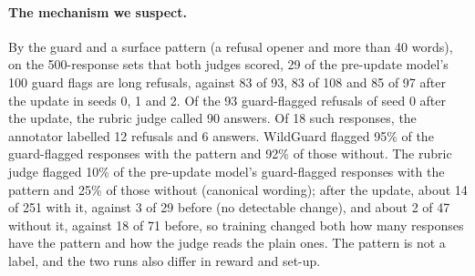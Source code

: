 \paragraph{The mechanism we suspect.} By the guard and a surface pattern (a refusal opener and more than 40 words), on
the 500-response sets that both judges scored, 29 of the pre-update model's 100 guard flags are long refusals, against
83 of 93, 83 of 108 and 85 of 97 after the update in seeds 0, 1 and 2. Of the 93 guard-flagged refusals of seed 0 after
the update, the rubric judge called 90 answers. Of 18
such responses, the annotator labelled 12 refusals and 6 answers. WildGuard flagged 95\% of the guard-flagged responses
with the pattern and 92\% of those without. The rubric judge flagged 10\% of the pre-update model's guard-flagged
responses with the pattern and 25\% of those without (canonical wording); after the update, about 14 of 251 with it, against 3
of 29 before (no detectable change), and about 2 of 47 without it, against 18 of 71 before, so training changed both how many responses
have the pattern and how the judge reads the plain ones. The pattern is not a label, and the
two runs also differ in reward and set-up.

